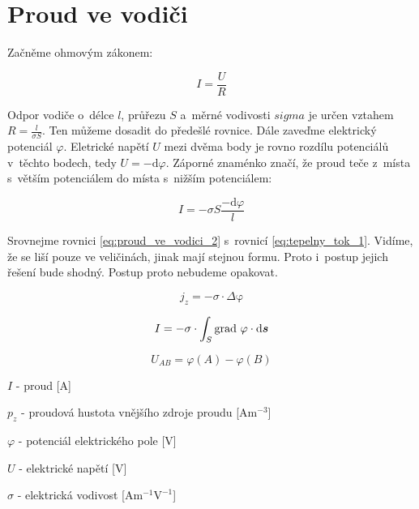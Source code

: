 \section{Proud ve vodiči}

Začněme ohmovým zákonem:

\begin{equation}
\label{eq:proud_ve_vodici_1}
I = \frac{U}{R}
\end{equation}

Odpor vodiče o~délce \(l\), průřezu \(S\) a~měrné vodivosti \(sigma\) je určen vztahem \(R = \frac{l}{\sigma S}\). Ten můžeme dosadit do předešlé rovnice. Dále zaveďme elektrický potenciál \(\varphi\). Eletrické napětí \(U\) mezi dvěma body je rovno rozdílu potenciálů v~těchto bodech, tedy \(U = -\mathrm{d}\varphi\). Záporné znaménko značí, že proud teče z~místa s~větším potenciálem do místa s~nižším potenciálem:

\begin{equation}
\label{eq:proud_ve_vodici_2}
I = -\sigma S \frac{-\mathrm{d}\varphi}{l}
\end{equation}

Srovnejme rovnici \eqref{eq:proud_ve_vodici_2} s~rovnicí \eqref{eq:tepelny_tok_1}. Vidíme, že se liší pouze ve veličinách, jinak mají stejnou formu. Proto i~postup jejich řešení bude shodný. Postup proto nebudeme opakovat.

\begin{fact}

\begin{equation}
j_z = -\sigma \cdot \Delta \mathrm{\varphi}
\end{equation}

\begin{equation}
I = -\sigma \cdot \int_{S} \grad \ \mathrm{\varphi} \cdot \mathrm{d}\vect{s} 
\end{equation}

\begin{equation}
U_{AB} = \varphi(A) - \varphi(B) 
\end{equation}

\(I\) - proud [\(\mathrm{A}\)]

\(p_z\) - proudová hustota vnějšího zdroje proudu [\(\mathrm{A} \mathrm{m}^{-3}\)]

\(\varphi\) - potenciál elektrického pole [\(\mathrm{V}\)]

\(U\) - elektrické napětí [\(\mathrm{V}\)]

\(\sigma\) - elektrická vodivost [\(\mathrm{A} \mathrm{m}^{-1} \mathrm{V}^{-1}\)] 
\end{fact}


